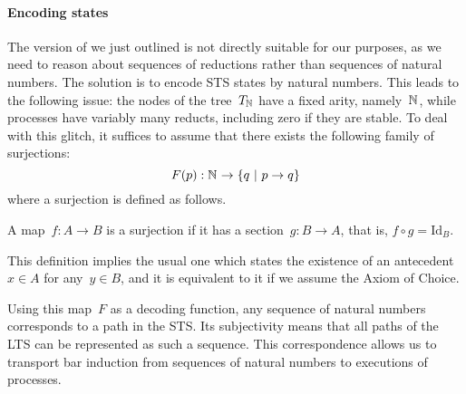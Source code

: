 


\paragraph{Encoding states}
The version of \barinduction we just outlined is not directly suitable for our
purposes, as we need to reason about sequences of reductions rather than sequences
of natural numbers. The solution is to encode STS states by natural %
numbers.
%
This leads to the following issue: the nodes of the tree~$T_{\mathbb{N}_{}}$ have a fixed
arity, namely~$\mathbb{N}_{}$, while processes have variably many reducts, including
zero if they are stable.
To deal with this glitch, it suffices to
assume that there exists the following family of surjections:
%
\renewcommand{\stateB}{q}
\begin{equation}
\label{eq:surjection}
  F( \state ) : \N \to \setof{ \stateB }{ \state \to \stateB }
\end{equation}
%
where a surjection is defined as follows.
%
\begin{definition}
  A map~$f: A \to B$ is a surjection if it has a section~$g: B \to A$, that is,
  $f \circ g = \mathrm{Id}_B$.
\end{definition}
\noindent
This definition implies the usual one which states the existence of an
antecedent~$x \in A$ for any~$y \in B$, and it is equivalent to it if we assume
the Axiom of Choice.

Using this map~$F$ as a decoding function, any sequence of natural
numbers corresponds to a path in the STS. Its subjectivity means that all paths
of the LTS can be represented as such a sequence. This correspondence allows us
to transport bar induction from sequences of natural numbers to executions of
processes.

